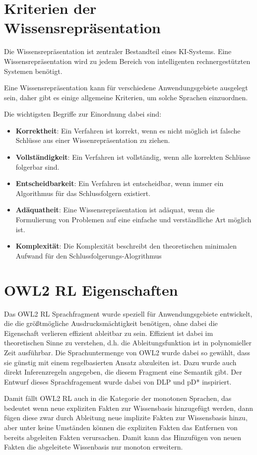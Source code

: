 \section{Kriterien der Wissensrepräsentation}

Die Wissensrepräsentation ist zentraler Bestandteil eines KI-Systems. Eine Wissensrepräsentation wird zu jedem Bereich von intelligenten rechnergestützten Systemen benötigt.

Eine Wissensrepräsentation kann für verschiedene Anwendungsgebiete ausgelegt sein, daher gibt es einige allgemeine Kriterien, um solche Sprachen einzuordnen.

Die wichtigsten Begriffe zur Einordnung dabei sind:
\begin{itemize}
  \item \textbf{Korrektheit}:
Ein Verfahren ist korrekt, wenn es nicht möglich ist falsche Schlüsse aus einer Wissenrepräsentation zu ziehen.
 \item \textbf{Vollständigkeit}:
Ein Verfahren ist vollständig, wenn alle korrekten Schlüsse folgerbar sind.
 \item \textbf{Entscheidbarkeit}:
Ein Verfahren ist entscheidbar, wenn immer ein Algorithmus für das Schlussfolgern existiert.
 \item \textbf{Adäquatheit}:
Eine Wissensrepräsentation ist adäquat, wenn die Formulierung von Problemen auf eine einfache und verständliche Art möglich ist.
 \item \textbf{Komplexität}:
Die Komplexität beschreibt den theoretischen minimalen Aufwand für den Schlussfolgerungs-Alogrithmus
\end{itemize}

\section{OWL2 RL Eigenschaften}
Das OWL2 RL Sprachfragment wurde speziell für Anwendungsgebiete entwickelt, die die größtmögliche Ausdrucksmächtigkeit benötigen, ohne dabei die Eigenschaft verlieren effizient ableitbar zu sein. Effizient ist dabei im theoretischen Sinne zu verstehen, d.h. die Ableitungsfunktion ist in polynomieller Zeit ausführbar. Die Sprachuntermenge von OWL2 wurde dabei so gewählt, dass sie günstig mit einem regelbasierten Ansatz abzuleiten ist. Dazu wurde auch direkt Inferenzregeln angegeben, die diesem Fragment eine Semantik gibt. Der Entwurf dieses Sprachfragement wurde dabei von DLP \cite{Grosof2003} und pD* \cite{Li2006} inspiriert.

Damit fällt OWL2 RL auch in die Kategorie der monotonen Sprachen, das bedeutet wenn neue expliziten Fakten zur Wissensbasis hinzugefügt werden, dann fügen diese zwar durch Ableitung neue implizite Fakten zur Wissensbasis hinzu, aber unter keine Umständen können die expliziten Fakten das Entfernen von bereits abgeleiten Fakten verursachen. Damit kann das Hinzufügen von neuen Fakten die abgeleitete Wissenbasis nur monoton erweitern.

